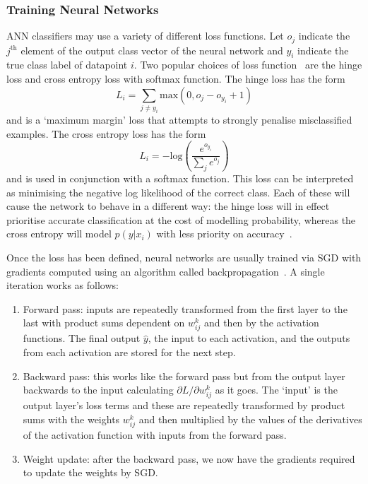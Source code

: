 \subsubsection{Training Neural Networks}

ANN classifiers may use a variety of different loss functions. 
Let $o_{j}$ indicate the $j^{\mathrm{th}}$ element of the output class vector of the neural network and $y_{i}$ indicate the true class label of datapoint $i$. 
Two popular choices of loss function~\cite{CS231n} are the hinge loss and cross entropy loss with softmax function.
The hinge loss has the form
\begin{equation}
    L_{i} = \sum_{j\neq{}y_{i}}\mathrm{max}(0,o_{j}-o_{y_{i}} + 1)
\end{equation}
and is a `maximum margin' loss that attempts to strongly penalise misclassified examples. 
The cross entropy loss has the form
\begin{equation}
    L_{i} = -\mathrm{log}\left(
        \frac{e^{o_{y_{i}}}}
        {\sum_{j}e^{o_{j}}}\right)
\end{equation}
and is used in conjunction with a softmax function. This loss can be interpreted as minimising the negative log likelihood of the correct class.
Each of these will cause the network to behave in a different way: the hinge loss will in effect prioritise accurate classification at the cost of modelling probability, whereas the cross entropy will model $p(y|x_{i})$ with less priority on accuracy~\cite{CS231n}.

Once the loss has been defined, neural networks are usually trained via SGD with gradients computed using an algorithm called backpropagation~\cite{Backprop}. A single iteration works as follows:
\begin{enumerate}[noitemsep]
    \item Forward pass: inputs are repeatedly transformed from the first layer to the last with product sums dependent on $w_{ij}^{k}$ and then by the activation functions. The final output $\hat{y}$, the input to each activation, and the outputs from each activation are stored for the next step. 
    \item Backward pass: this works like the forward pass but from the output layer backwards to the input calculating $\partial{L}/\partial{w_{ij}^{k}}$ as it goes. The `input' is the output layer's loss terms and these are repeatedly transformed by product sums with the weights $w_{ij}^{k}$ and then multiplied by the values of the derivatives of the activation function with inputs from the forward pass.  
    \item Weight update: after the backward pass, we now have the gradients required to update the weights by SGD.
\end{enumerate}


